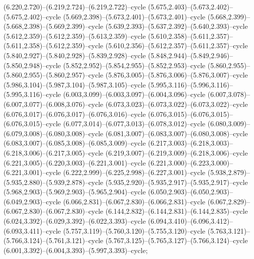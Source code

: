 (6.220,2.720)--(6.219,2.724)--(6.219,2.722)--cycle (5.675,2.403)--(5.673,2.402)--(5.675,2.402)--cycle (5.669,2.398)--(5.673,2.401)--(5.673,2.401)--cycle (5.668,2.399)--(5.668,2.398)--(5.669,2.399)--cycle (5.639,2.393)--(5.637,2.392)--(5.640,2.393)--cycle (5.612,2.359)--(5.612,2.359)--(5.613,2.359)--cycle (5.610,2.358)--(5.611,2.357)--(5.611,2.358)--(5.612,2.359)--cycle (5.610,2.356)--(5.612,2.357)--(5.611,2.357)--cycle (5.840,2.927)--(5.840,2.928)--(5.839,2.928)--cycle (5.848,2.944)--(5.849,2.946)--(5.850,2.948)--cycle (5.852,2.952)--(5.854,2.955)--(5.852,2.953)--cycle (5.860,2.955)--(5.860,2.955)--(5.860,2.957)--cycle (5.876,3.005)--(5.876,3.006)--(5.876,3.007)--cycle (5.986,3.104)--(5.987,3.104)--(5.987,3.105)--cycle (5.995,3.116)--(5.996,3.116)--(5.995,3.116)--cycle (6.003,3.099)--(6.003,3.097)--(6.004,3.096)--cycle (6.007,3.078)--(6.007,3.077)--(6.008,3.076)--cycle (6.073,3.023)--(6.073,3.022)--(6.073,3.022)--cycle (6.076,3.017)--(6.076,3.017)--(6.076,3.016)--cycle (6.076,3.015)--(6.076,3.015)--(6.076,3.015)--cycle (6.077,3.014)--(6.077,3.013)--(6.078,3.012)--cycle (6.080,3.009)--(6.079,3.008)--(6.080,3.008)--cycle (6.081,3.007)--(6.083,3.007)--(6.080,3.008)--cycle (6.083,3.007)--(6.085,3.008)--(6.085,3.009)--cycle (6.217,3.003)--(6.218,3.003)--(6.218,3.006)--(6.217,3.005)--cycle (6.219,3.007)--(6.219,3.009)--(6.218,3.006)--cycle (6.221,3.005)--(6.220,3.003)--(6.221,3.001)--cycle (6.221,3.000)--(6.223,3.000)--(6.221,3.001)--cycle (6.222,2.999)--(6.225,2.998)--(6.227,3.001)--cycle (5.938,2.879)--(5.935,2.880)--(5.939,2.878)--cycle (5.935,2.920)--(5.935,2.917)--(5.935,2.917)--cycle (5.968,2.903)--(5.969,2.903)--(5.965,2.904)--cycle (6.050,2.903)--(6.050,2.903)--(6.049,2.903)--cycle (6.066,2.831)--(6.067,2.830)--(6.066,2.831)--cycle (6.067,2.829)--(6.067,2.830)--(6.067,2.830)--cycle (6.144,2.832)--(6.144,2.831)--(6.144,2.835)--cycle (6.024,3.392)--(6.029,3.392)--(6.022,3.393)--cycle (6.094,3.410)--(6.096,3.412)--(6.093,3.411)--cycle (5.757,3.119)--(5.760,3.120)--(5.755,3.120)--cycle (5.763,3.121)--(5.766,3.124)--(5.761,3.121)--cycle (5.767,3.125)--(5.765,3.127)--(5.766,3.124)--cycle (6.001,3.392)--(6.004,3.393)--(5.997,3.393)--cycle;
